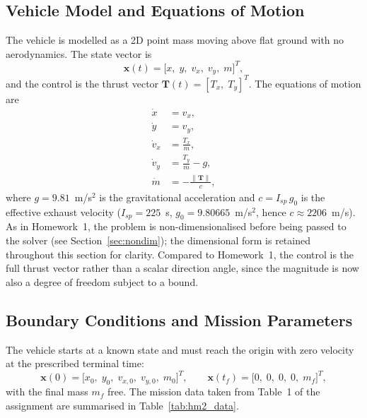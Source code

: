 \documentclass[../main.tex]{subfiles}
\begin{document}
\subsection{Vehicle Model and Equations of Motion}\label{sec:hm2_dynamics}

The vehicle is modelled as a 2D point mass moving above flat ground with no aerodynamics. The state vector is
\begin{equation}
    \mathbf{x}(t) = \bigl[x,\; y,\; v_x,\; v_y,\; m\bigr]^T,
\end{equation}
and the control is the thrust vector $\mathbf{T}(t) = [T_x,\; T_y]^T$. The equations of motion are
\begin{align}
    \dot{x}   &= v_x, \label{eq:hm2_xdot}\\
    \dot{y}   &= v_y, \label{eq:hm2_ydot}\\
    \dot{v}_x &= \frac{T_x}{m}, \label{eq:hm2_vxdot}\\
    \dot{v}_y &= \frac{T_y}{m} - g, \label{eq:hm2_vydot}\\
    \dot{m}   &= -\frac{\|\mathbf{T}\|}{c}, \label{eq:hm2_mdot}
\end{align}
where $g = 9.81$~m/s$^2$ is the gravitational acceleration and $c = I_{sp}\,g_0$ is the effective exhaust velocity ($I_{sp} = 225$~s, $g_0 = 9.80665$~m/s$^2$, hence $c \approx 2206$~m/s). As in Homework~1, the problem is non-dimensionalised before being passed to the solver (see Section~\ref{sec:nondim}); the dimensional form is retained throughout this section for clarity. Compared to Homework~1, the control is the full thrust vector rather than a scalar direction angle, since the magnitude is now also a degree of freedom subject to a bound.

\subsection{Boundary Conditions and Mission Parameters}\label{sec:hm2_bc}

The vehicle starts at a known state and must reach the origin with zero velocity at the prescribed terminal time:
\begin{equation}
    \mathbf{x}(0) = \bigl[x_0,\; y_0,\; v_{x,0},\; v_{y,0},\; m_0\bigr]^T,
    \qquad
    \mathbf{x}(t_f) = \bigl[0,\; 0,\; 0,\; 0,\; m_f\bigr]^T,
\end{equation}
with the final mass $m_f$ free. The mission data taken from Table~1 of the assignment are summarised in Table~\ref{tab:hm2_data}.
\end{document}
